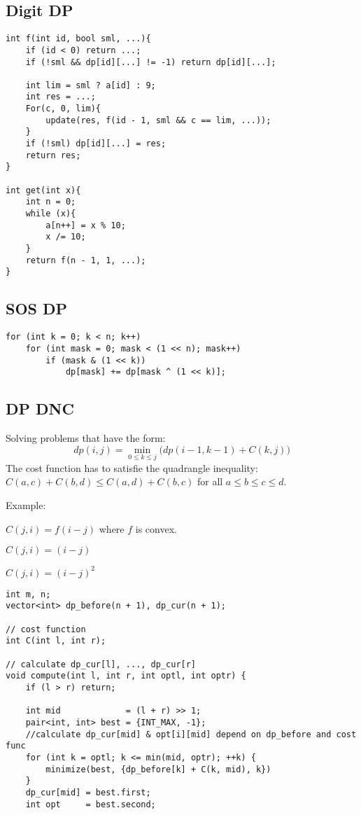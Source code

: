 \documentclass[11pt,a4paper]{article}
\begin{document}
\begin{multicols*}{2}
\subsection{Digit DP}
\begin{lstlisting}
int f(int id, bool sml, ...){
    if (id < 0) return ...;
    if (!sml && dp[id][...] != -1) return dp[id][...];

    int lim = sml ? a[id] : 9;
    int res = ...;
    For(c, 0, lim){
        update(res, f(id - 1, sml && c == lim, ...));
    }
    if (!sml) dp[id][...] = res;
    return res;
}

int get(int x){
    int n = 0;
    while (x){
        a[n++] = x % 10;
        x /= 10;
    }
    return f(n - 1, 1, ...);
}
\end{lstlisting}

\subsection{SOS DP}
\begin{lstlisting}
for (int k = 0; k < n; k++)
    for (int mask = 0; mask < (1 << n); mask++)
        if (mask & (1 << k)) 
            dp[mask] += dp[mask ^ (1 << k)];
\end{lstlisting}

\subsection{DP DNC}

Solving problems that have the form:
\[
dp(i, j) =
\min\limits_{0 \le k \le j} \Big( dp(i - 1, k - 1) + C(k, j) \Big)
\]
The cost function has to satisfie the quadrangle inequality:
$C(a, c) + C(b, d) \leq C(a, d) + C(b, c)$ for all $a \leq b \leq c \leq d$.

Example:

$C(j, i) = f(i - j)$ where $f$ is convex.

$C(j, i) = (i - j)$

$C(j, i) = (i - j)^2$
\begin{lstlisting}
int m, n;
vector<int> dp_before(n + 1), dp_cur(n + 1);

// cost function
int C(int l, int r);

// calculate dp_cur[l], ..., dp_cur[r]
void compute(int l, int r, int optl, int optr) {
    if (l > r) return;

    int mid             = (l + r) >> 1;
    pair<int, int> best = {INT_MAX, -1};
    //calculate dp_cur[mid] & opt[i][mid] depend on dp_before and cost func
    for (int k = optl; k <= min(mid, optr); ++k) {
        minimize(best, {dp_before[k] + C(k, mid), k})
    }
    dp_cur[mid] = best.first;
    int opt     = best.second;


\end{lstlisting}
\end{multicols*}
\end{document}

